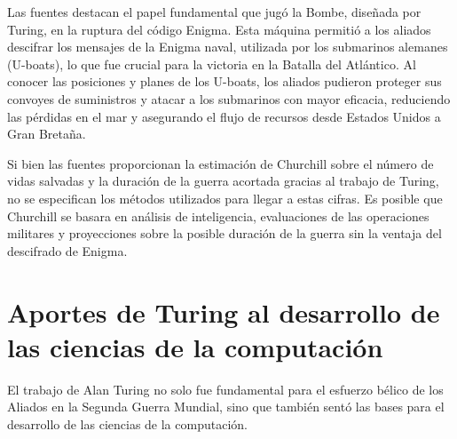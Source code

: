 \documentclass{article}
\begin{document}
Las fuentes destacan el papel fundamental que 
jugó la Bombe, diseñada por Turing, en la ruptura 
del código Enigma. Esta máquina permitió a los 
aliados descifrar los mensajes de la Enigma naval, 
utilizada por los submarinos alemanes (U-boats), 
lo que fue crucial para la victoria en la Batalla 
del Atlántico. Al conocer las posiciones y planes 
de los U-boats, los aliados pudieron proteger sus 
convoyes de suministros y atacar a los submarinos 
con mayor eficacia, reduciendo las pérdidas en el 
mar y asegurando el flujo de recursos desde 
Estados Unidos a Gran Bretaña.

Si bien las fuentes proporcionan la estimación 
de Churchill sobre el número de vidas salvadas 
y la duración de la guerra acortada gracias al 
trabajo de Turing, no se especifican los métodos 
utilizados para llegar a estas cifras. 
Es posible que Churchill se basara en análisis 
de inteligencia, evaluaciones de las operaciones 
militares y proyecciones sobre la posible duración 
de la guerra sin la ventaja del descifrado de Enigma.\cite{AlanTuringEnigmaO}


\section{Aportes de Turing al desarrollo de las ciencias de la computación}

El trabajo de Alan Turing no solo fue fundamental para el esfuerzo bélico de los 
Aliados en la Segunda Guerra Mundial, sino que también sentó las bases para el desarrollo 
de las ciencias de la computación.
\end{document}
